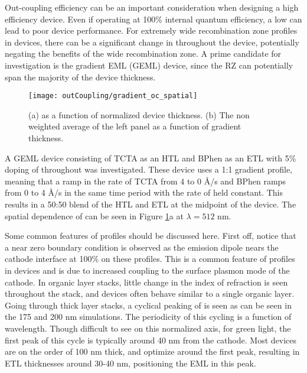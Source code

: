 \documentclass[../thesis.tex]{subfiles}
\begin{document}
Out-coupling efficiency can be an important consideration when designing a high efficiency device.
Even if operating at 100\% internal quantum efficiency, a low \oc can lead to poor device performance.\supercite{Baldo1998a}
For extremely wide recombination zone profiles in devices, there can be a significant change in \oc throughout the device, potentially negating the benefits of the wide recombination zone.
A prime candidate for \oc investigation is the gradient EML (GEML) device, since the RZ can potentially span the majority of the device thickness.\supercite{Erickson2014}

\begin{figure}[ht]
\centering
\texttt{[image: outCoupling/gradient\_oc\_spatial]}
\caption{(a) \oc as a function of normalized device thickness.  (b) The non weighted average of the left panel as a function of gradient thickness.}
\label{fig:gradient_spatial}
\end{figure}

A GEML device consisting of TCTA as an HTL and BPhen as an ETL with 5\% doping of \irppy throughout was investigated.
These device uses a 1:1 gradient profile, meaning that a ramp in the rate of TCTA from 4 to 0 \r{A}/s and BPhen ramps from 0 to 4 \r{A}/s in the same time period with the rate of \irppy held constant.
This results in a 50:50 blend of the HTL and ETL at the midpoint of the device.
The spatial dependence of \oc can be seen in Figure \ref{fig:gradient_spatial}a at $\lambda=512$ nm.

Some common features of \oc profiles should be discussed here.
First off, notice that a near zero boundary condition is observed as the emission dipole nears the cathode interface at 100\% on these profiles.
This is a common feature of \oc profiles in devices and is due to increased coupling to the surface plasmon mode of the cathode.
In organic layer stacks, little change in the index of refraction is seen throughout the stack, and devices often behave similar to a single organic layer.
Going through thick layer stacks, a cyclical peaking of \oc is seen as can be seen in the 175 and 200 nm simulations.
The periodicity of this cycling is a function of wavelength.
Though difficult to see on this normalized axis, for green light, the first peak of this cycle is typically around 40 nm from the cathode.
Most devices are on the order of 100 nm thick, and optimize around the first peak, resulting in ETL thicknesses around 30-40 nm, positioning the EML in this peak.
\end{document}
